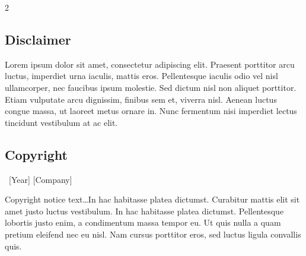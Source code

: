 \documentclass[
	a4paper, %
]{CSMakotoTechnicalReport}
\begin{document}

\newpage

\begin{multicols}{2} %


\printbibliography[title=Reference List] %

\end{multicols} %


\vfill %

\begingroup
	\footnotesize %
	
	\subsection*{Disclaimer}

	Lorem ipsum dolor sit amet, consectetur adipiscing elit. Praesent porttitor arcu luctus, imperdiet urna iaculis, mattis eros. Pellentesque iaculis odio vel nisl ullamcorper, nec faucibus ipsum molestie. Sed dictum nisl non aliquet porttitor. Etiam vulputate arcu dignissim, finibus sem et, viverra nisl. Aenean luctus congue massa, ut laoreet metus ornare in. Nunc fermentum nisi imperdiet lectus tincidunt vestibulum at ac elit.
	
	\subsection*{Copyright}
	
	\textcopyright~[Year] [Company] 
	
	Copyright notice text\ldots In hac habitasse platea dictumst. Curabitur mattis elit sit amet justo luctus vestibulum. In hac habitasse platea dictumst. Pellentesque lobortis justo enim, a condimentum massa tempor eu. Ut quis nulla a quam pretium eleifend nec eu nisl. Nam cursus porttitor eros, sed luctus ligula convallis quis.
	
\end{document}
